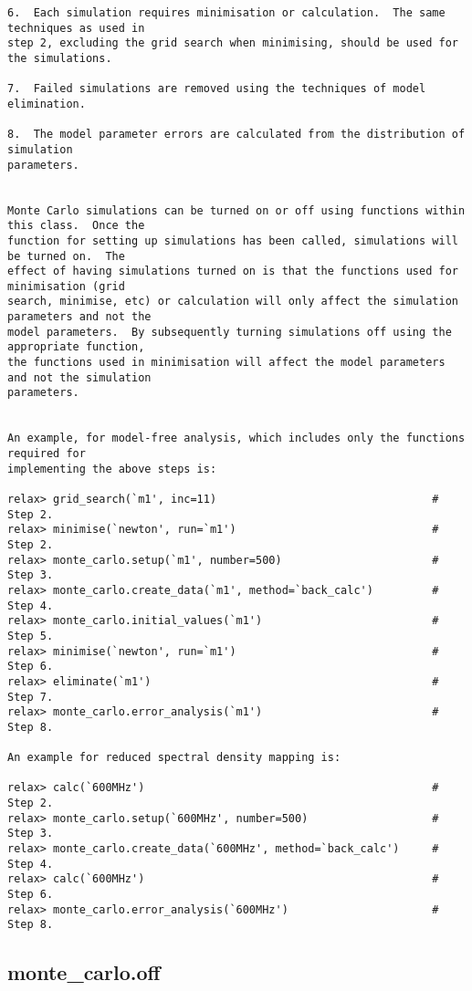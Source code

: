 {\begin{verbatim}
6.  Each simulation requires minimisation or calculation.  The same techniques as used in
step 2, excluding the grid search when minimising, should be used for the simulations.

7.  Failed simulations are removed using the techniques of model elimination.

8.  The model parameter errors are calculated from the distribution of simulation
parameters.


Monte Carlo simulations can be turned on or off using functions within this class.  Once the
function for setting up simulations has been called, simulations will be turned on.  The
effect of having simulations turned on is that the functions used for minimisation (grid
search, minimise, etc) or calculation will only affect the simulation parameters and not the
model parameters.  By subsequently turning simulations off using the appropriate function,
the functions used in minimisation will affect the model parameters and not the simulation
parameters.


An example, for model-free analysis, which includes only the functions required for
implementing the above steps is:

relax> grid_search(`m1', inc=11)                                 # Step 2.
relax> minimise(`newton', run=`m1')                              # Step 2.
relax> monte_carlo.setup(`m1', number=500)                       # Step 3.
relax> monte_carlo.create_data(`m1', method=`back_calc')         # Step 4.
relax> monte_carlo.initial_values(`m1')                          # Step 5.
relax> minimise(`newton', run=`m1')                              # Step 6.
relax> eliminate(`m1')                                           # Step 7.
relax> monte_carlo.error_analysis(`m1')                          # Step 8.

An example for reduced spectral density mapping is:

relax> calc(`600MHz')                                            # Step 2.
relax> monte_carlo.setup(`600MHz', number=500)                   # Step 3.
relax> monte_carlo.create_data(`600MHz', method=`back_calc')     # Step 4.
relax> calc(`600MHz')                                            # Step 6.
relax> monte_carlo.error_analysis(`600MHz')                      # Step 8.
\end{verbatim}
}



\newpage

\subsection{monte\_carlo.off}


